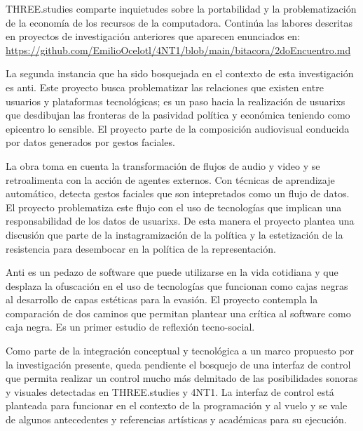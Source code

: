 THREE.studies comparte inquietudes sobre la portabilidad y la problematización de la economía de los recursos de la computadora. Continúa las labores descritas en proyectos de investigación anteriores que aparecen enunciados en: \url{https://github.com/EmilioOcelotl/4NT1/blob/main/bitacora/2doEncuentro.md}

La segunda instancia que ha sido bosquejada en el contexto de esta investigación es anti. Este proyecto busca problematizar las relaciones que existen entre usuarios y plataformas tecnológicas; es un paso hacia la realización de usuarixs que desdibujan las fronteras de la pasividad política y económica teniendo como epicentro lo sensible. El proyecto parte de la composición audiovisual conducida por datos generados por gestos faciales. 

La obra toma en cuenta la transformación de flujos de audio y video y se retroalimenta con la acción de agentes externos. Con técnicas de aprendizaje automático, detecta gestos faciales que son intepretados como un flujo de datos. El proyecto problematiza este flujo con el uso de tecnologías que implican una responsabilidad de los datos de usuarixs. De esta manera el proyecto plantea una discusión que parte de la instagramización de la política y la estetización de la resistencia para desembocar en la política de la representación.

Anti es un pedazo de software que puede utilizarse en la vida cotidiana y que desplaza la ofuscación en el uso de tecnologías que funcionan como cajas negras al desarrollo de capas estéticas para la evasión. El proyecto contempla la comparación de dos caminos que permitan plantear una crítica al software como caja negra. Es un primer estudio de reflexión tecno-social.

Como parte de la integración conceptual y tecnológica a un marco propuesto por la investigación presente, queda pendiente el bosquejo de una interfaz de control que permita realizar un control mucho más delmitado de las posibilidades sonoras y visuales detectadas en THREE.studies y 4NT1. La interfaz de control está planteada para funcionar en el contexto de la programación y al vuelo y se vale de algunos antecedentes y referencias artísticas y académicas para su ejecución. 



